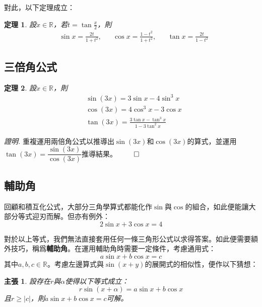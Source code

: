 \documentclass[12pt]{article}
\newtheorem*{theorem}{定理}
\newtheorem*{claim}{主張}
\renewenvironment*{proof}{\textit{證明.}}{\hfill$\qed$}
\begin{document}
    對此，以下定理成立：

    \begin{theorem}
        設$x\in\mathbb{R}$，若$t=\tan{\frac{x}{2}}$，則\begin{align*}
            &\sin{x}=\frac{2t}{1+t^2},&&\cos{x}=\frac{1-t^2}{1+t^2},&&\tan{x}=\frac{2t}{1-t^2}
        \end{align*}
    \end{theorem}

    \subsection*{三倍角公式}

    \begin{theorem}
        設$x\in\mathbb{R}$，則\begin{align*}
            &\sin(3x)=3\sin{x}-4\sin^3{x}\\
            &\cos(3x)=4\cos^3{x}-3\cos{x}\\
            &\tan(3x)=\frac{3\tan{x}-\tan^3{x}}{1-3\tan^2{x}}
        \end{align*}
    \end{theorem}

    \begin{proof}
        重複運用兩倍角公式以推導出$\sin(3x)$和$\cos(3x)$的算式，並運用$\tan(3x)=\dfrac{\sin(3x)}{\cos(3x)}$推導結果。
    \end{proof}

    \subsection*{輔助角}

    回顧和積互化公式，大部分三角學算式都能化作$\sin$與$\cos$的組合，如此便能讓大部分等式迎刃而解。但亦有例外：$$2\sin{x}+3\cos{x}=4$$

    對於以上等式，我們無法直接套用任何一條三角形公式以求得答案。如此便需要額外技巧，稱爲\textbf{輔助角}。在運用輔助角時需要一定條件，考慮通用式：$$a\sin{x}+b\cos{x}=c$$其中$a,b,c\in\mathbb{R}$。考慮左邊算式與$\sin(x+y)$的展開式的相似性，便作以下猜想：

    \begin{claim}
        設存在$r$與$\alpha$使得以下等式成立：$$r\sin(x+\alpha)=a\sin{x}+b\cos{x}$$且$r\geq |c|$，則$a\sin{x}+b\cos{x}=c$可解。
    \end{claim}
\end{document}
